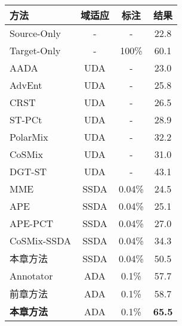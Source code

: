 \begin{table}[H]
	\renewcommand{\arraystretch}{1}
    \centering
    \setlength{\tabcolsep}{10mm}
    \label{tab:4-1}
    \wuhao
    \begin{tabular}{lccc}
        \toprule[1.5pt]
        \textbf{方法} & \textbf{域适应} & \textbf{标注} & \textbf{结果} \\
        \midrule
        Source-Only   & -          & -       & 22.8 \\
        Target-Only   & -          & 100\%       & 60.1 \\
        AADA          & UDA & -       & 23.0 \\
        AdvEnt        & UDA & -       & 25.8 \\
        CRST          & UDA & -       & 26.5 \\
        ST-PCt        & UDA & -       & 28.9 \\
        PolarMix      & UDA & -       & 32.2 \\
        CoSMix        & UDA & -       & 31.0 \\
        DGT-ST        & UDA & -       & 43.1 \\
        MME           & SSDA & 0.04\%  & 24.5 \\
        APE           & SSDA & 0.04\%  & 25.1 \\
        APE-PCT       & SSDA & 0.04\%  & 27.0 \\
        CoSMix-SSDA   & SSDA & 0.04\%  & 34.3 \\
        本章方法       & SSDA   & 0.04\%   & 50.5 \\
        Annotator     & ADA   & 0.1\%     & 57.7 \\
        前章方法     & ADA   & 0.1\%     & 58.7 \\
        \textbf{本章方法}       & ADA   & 0.1\%     & \textbf{65.5} \\
        \bottomrule[1.5pt]
    \end{tabular}
\end{table}